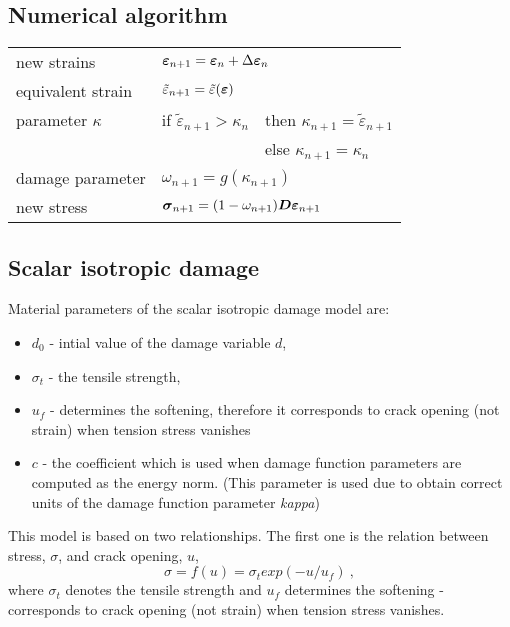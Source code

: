 \subsection{Numerical algorithm}
\begin{center}
\begin{tabular}{|l|ll|}
\hline
new strains & \multicolumn{2}{l|}{$\mbox{\boldmath$\varepsilon$}_{n+1}=\mbox{\boldmath$\varepsilon$}_{n} + \Delta\mbox{\boldmath$\varepsilon$}_{n}$}
\\[3mm]
equivalent strain & \multicolumn{2}{l|}{$\tilde{\varepsilon}_{n+1}=\tilde{\varepsilon}(\mbox{\boldmath$\varepsilon$})$}
\\[3mm]
parameter $\kappa$ & if $\tilde{\varepsilon}_{n+1}>\kappa_n$ & then $\kappa_{n+1}=\tilde{\varepsilon}_{n+1}$
\\[3mm]
 & & else $\kappa_{n+1}=\kappa_n$
\\[3mm]
damage parameter & \multicolumn{2}{l|}{$\omega_{n+1} = g(\kappa_{n+1})$}
\\[3mm]
new stress & \multicolumn{2}{l|}{$\mbox{\boldmath$\sigma$}_{n+1}=(1-\omega_{n+1})\mbox{\boldmath$D$} \mbox{\boldmath$\varepsilon$}_{n+1}$}
\\ \hline
\end{tabular}
\end{center}

\subsection {Scalar isotropic damage}
\label{theoscdam}

Material parameters of the scalar isotropic damage model are:
\begin{itemize}
\item[]{$d_0$ - intial value of the damage variable $d$,}
\item[]{$\sigma_t$ -  the tensile strength,}
\item[]{$u_f$  -  determines the softening, therefore it corresponds to crack opening (not strain) when tension stress vanishes}
\item[]{$c$ -  the coefficient which is used when damage function parameters are computed as the energy norm.
(This parameter is used due to obtain correct units of the damage function parameter {\it kappa})}
\end{itemize}

This model is based on two relationships. The first one is the relation between stress, $\sigma$, and crack opening, $u$,
\begin{equation}
\sigma = f(u) = \sigma_t exp(-u/u_f)\ ,
\end{equation}
where $\sigma_t$ denotes the tensile strength  and 
$u_f$ determines the softening - corresponds to crack opening (not strain) when tension stress vanishes.


